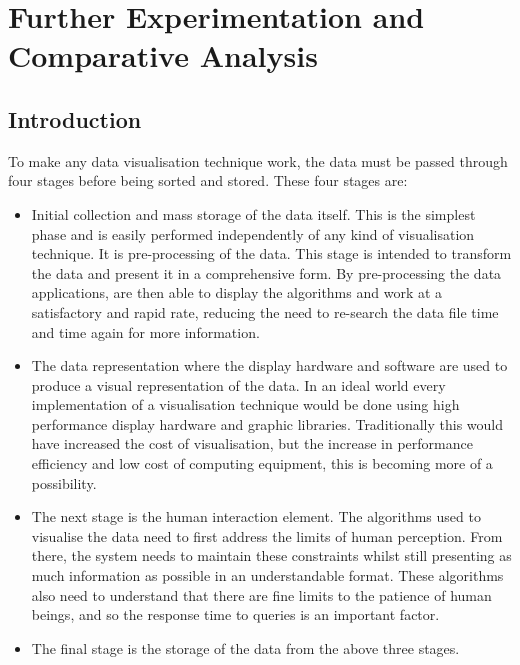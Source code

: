 
\chapter{Further Experimentation and Comparative Analysis} %

\label{Chapter7} %



\section{Introduction}

To make any data visualisation technique work, the data must be passed through four stages before being sorted and stored. These four stages are:
\begin{itemize}
\item 	Initial collection and mass storage of the data itself. This is the simplest phase and is easily performed independently of any kind of visualisation technique. It is pre-processing of the data. This stage is intended to transform the data and present it in a comprehensive form. By pre-processing the data applications, are then able to display the algorithms and work at a satisfactory and rapid rate, reducing the need to re-search the data file time and time again for more information.

\item	The data representation where the display hardware and software are used to produce a visual representation of the data. In an ideal world every implementation of a visualisation technique would be done using high performance display hardware and graphic libraries. Traditionally this would have increased the cost of visualisation, but the increase in performance efficiency and low cost of computing equipment, this is becoming more of a possibility.

\item	The next stage is the human interaction element. The algorithms used to visualise the data need to first address the limits of human perception. From there, the system needs to maintain these constraints whilst still presenting as much information as possible in an understandable format. These algorithms also need to understand that there are fine limits to the patience of human beings, and so the response time to queries is an important factor.

\item	The final stage is the storage of the data from the above three stages. 
\end{itemize}

